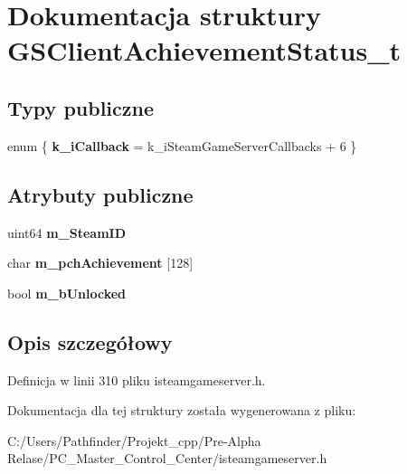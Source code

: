 \hypertarget{struct_g_s_client_achievement_status__t}{}\section{Dokumentacja struktury G\+S\+Client\+Achievement\+Status\+\_\+t}
\label{struct_g_s_client_achievement_status__t}
\subsection*{Typy publiczne}
\begin{DoxyCompactItemize}
\item 
\mbox{\label{struct_g_s_client_achievement_status__t_ab8cdb9781cf7a15c7e3932606dfc48e2}} 
enum \{ {\bfseries k\+\_\+i\+Callback} = k\+\_\+i\+Steam\+Game\+Server\+Callbacks + 6
 \}
\end{DoxyCompactItemize}
\subsection*{Atrybuty publiczne}
\begin{DoxyCompactItemize}
\item 
\mbox{\label{struct_g_s_client_achievement_status__t_a804f6f11137f580579e45b00515dd402}} 
uint64 {\bfseries m\+\_\+\+Steam\+ID}
\item 
\mbox{\label{struct_g_s_client_achievement_status__t_ad2610d357cd03c57074fd7588ad3cdcb}} 
char {\bfseries m\+\_\+pch\+Achievement} \mbox{[}128\mbox{]}
\item 
\mbox{\label{struct_g_s_client_achievement_status__t_a5b4d71b206d20edc9f553750db4cb6c5}} 
bool {\bfseries m\+\_\+b\+Unlocked}
\end{DoxyCompactItemize}


\subsection{Opis szczegółowy}


Definicja w linii 310 pliku isteamgameserver.\+h.



Dokumentacja dla tej struktury została wygenerowana z pliku\+:\begin{DoxyCompactItemize}
\item 
C\+:/\+Users/\+Pathfinder/\+Projekt\+\_\+cpp/\+Pre-\/\+Alpha Relase/\+P\+C\+\_\+\+Master\+\_\+\+Control\+\_\+\+Center/isteamgameserver.\+h\end{DoxyCompactItemize}
